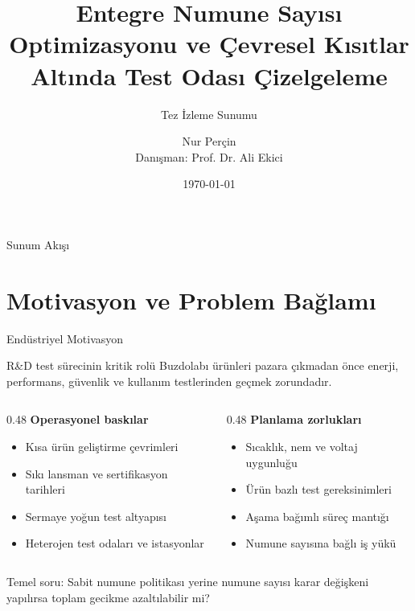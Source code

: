 \documentclass[aspectratio=169,11pt]{beamer}
\title[Tez İzleme Sunumu]{Entegre Numune Sayısı Optimizasyonu ve Çevresel Kısıtlar Altında Test Odası Çizelgeleme}
\subtitle{Tez İzleme Sunumu}
\author[N. Perçin]{Nur Perçin\\\small Danışman: Prof. Dr. Ali Ekici}
\institute[ÖzÜ]{Özyeğin Üniversitesi\\Endüstri Mühendisliği Bölümü}
\date{\today}
\begin{document}
\begin{frame}
  \titlepage
\end{frame}

\begin{frame}{Sunum Akışı}
  \tableofcontents
\end{frame}

\section{Motivasyon ve Problem Bağlamı}

\begin{frame}{Endüstriyel Motivasyon}
  \begin{block}{R\&D test sürecinin kritik rolü}
    Buzdolabı ürünleri pazara çıkmadan önce enerji, performans, güvenlik ve kullanım testlerinden geçmek zorundadır.
  \end{block}

  \begin{columns}[T,totalwidth=\textwidth]
    \begin{column}{0.48\textwidth}
      \textbf{Operasyonel baskılar}
      \begin{itemize}
        \item Kısa ürün geliştirme çevrimleri
        \item Sıkı lansman ve sertifikasyon tarihleri
        \item Sermaye yoğun test altyapısı
        \item Heterojen test odaları ve istasyonlar
      \end{itemize}
    \end{column}
    \begin{column}{0.48\textwidth}
      \textbf{Planlama zorlukları}
      \begin{itemize}
        \item Sıcaklık, nem ve voltaj uygunluğu
        \item Ürün bazlı test gereksinimleri
        \item Aşama bağımlı süreç mantığı
        \item Numune sayısına bağlı iş yükü
      \end{itemize}
    \end{column}
  \end{columns}

  \vspace{2mm}
  \alert{Temel soru:} Sabit numune politikası yerine numune sayısı karar değişkeni yapılırsa toplam gecikme azaltılabilir mi?
\end{frame}
\end{document}
